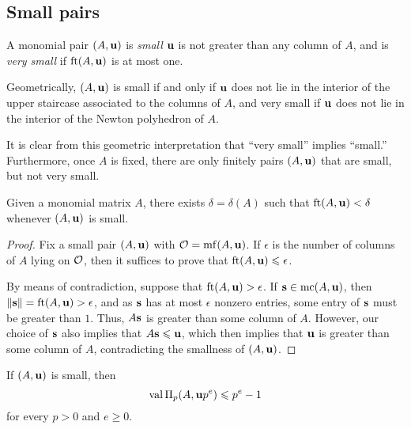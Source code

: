 \documentclass[11pt]{amsart}
\begin{document}
\subsection{Small pairs}



\begin{definition}
A monomial pair $(A, \mathbf{u})$ is \emph{small} $\mathbf{u}$ is not greater than any column of $A$, and is \emph{very small} if $\operatorname{ft}(A, \mathbf{u})$ is at most one.
\end{definition}

\begin{remark}
\label{finitely many small but not very small: R}
Geometrically, $(A, \mathbf{u})$ is small if and only if $\mathbf{u}$ does not lie in the interior of the upper staircase associated to the columns of $A$, and very small if $\mathbf{u}$ does not lie in the interior of the Newton polyhedron of $A$.  

It is clear from this geometric interpretation that ``very small'' implies ``small.''  Furthermore, once $A$ is fixed, there are only finitely pairs $(A, \mathbf{u})$ that are small, but not very small. 
\end{remark}

\begin{lemma}
\label{refined-discreteness: L}
Given a monomial matrix $A$, there exists $\delta = \delta(A)$ such that $\operatorname{ft}(A, \mathbf{u}) < \delta$ whenever $(A, \mathbf{u})$ is small.
\end{lemma}

\begin{proof}   Fix a small pair $(A, \mathbf{u})$ with $\mathcal{O} = \operatorname{mf}(A, \mathbf{u})$.  If $\epsilon$ is the number of columns of $A$ lying on $\mathcal{O}$, then it suffices to prove that $\operatorname{ft}(A, \mathbf{u}) \leqslant \epsilon$.

By means of contradiction, suppose that $\operatorname{ft}(A, \mathbf{u}) > \epsilon$.  If $\mathbf{s} \in \operatorname{mc}(A,\mathbf{u})$, then $\| \mathbf{s} \| = \operatorname{ft}(A, \mathbf{u}) > \epsilon$, and as $\mathbf{s}$ has at most $\epsilon$ nonzero entries, some entry of $\mathbf{s}$ must be greater than $1$.  Thus, $A \mathbf{s}$ is greater than some column of $A$.  However, our choice of $\mathbf{s}$ also implies that $A \mathbf{s} \leqslant \mathbf{u}$, which then implies that $\mathbf{u}$ is greater than some column of $A$, contradicting the smallness of $(A, \mathbf{u})$.
\end{proof}

\begin{lemma}
\label{trivial value bound: L}
If $(A, \mathbf{u})$ is small, then 
 \[ \operatorname{val} \Pi_p(A, \mathbf{u}p^e) \leqslant p^{e} -1 \] for every $p > 0$ and $e \geq 0$.
\end{lemma}
\end{document}
